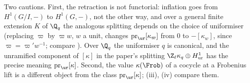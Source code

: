 \begin{remark}
Two cautions. First, the retraction is not functorial: inflation goes from $H^1(G/I,-)$ to $H^1(G,-)$, not the other way, and over a general finite extension $K$ of
$\Q_q$ the analogous splitting depends on the choice of uniformiser (replacing $\varpi$ by $\varpi w$, $w$ a unit, changes $\operatorname{pr}_{\ur}[\kappa_\varpi]$ from $0$ to
$-[\kappa_w]$, since $\varpi=\varpi'w^{-1}$; compare ). Over $\Q_q$ the uniformiser $q$ is canonical, and the unramified component of $[\kappa]$ in the paper's splitting $\Z_\ell\kappa_q\oplus H^1_{\mathrm{ur}}$ has the precise meaning
$\operatorname{pr}_{\ur}[\kappa]$. Second, the value $\kappa(\Frob)$ of a cocycle at a Frobenius lift is a different object from the class $\operatorname{pr}_{\ur}[\kappa]$;
(iii), (iv) compare them.
\end{remark}

